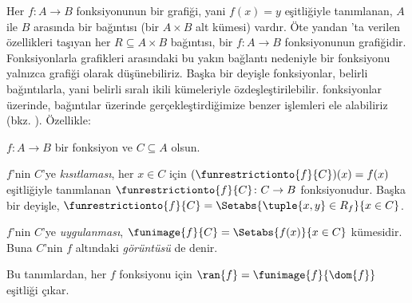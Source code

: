 \begin{explain}
Her $f\colon A \to B$ fonksiyonunun bir grafiği, yani $f(x)=y$ eşitliğiyle
tanımlanan, $A$ ile $B$ arasında bir bağıntısı (bir $A\times B$ alt kümesi)
vardır. Öte yandan
'ta verilen özellikleri taşıyan her
$R \subseteq A \times B$ bağıntısı, bir $f \colon A \to B$ fonksiyonunun
grafiğidir. Fonksiyonlarla grafikleri arasındaki bu yakın bağlantı nedeniyle
bir fonksiyonu yalnızca grafiği olarak düşünebiliriz. Başka bir deyişle
fonksiyonlar, belirli bağıntılarla, yani belirli sıralı ikili kümeleriyle
özdeşleştirilebilir.  fonksiyonlar
üzerinde, bağıntılar üzerinde gerçekleştirdiğimize benzer işlemleri ele
alabiliriz (bkz. ). Özellikle:
\end{explain}

\begin{defn}
$f \colon A \to B$ bir fonksiyon ve $C\subseteq A$ olsun.

$f$'nin $C$'ye \emph{kısıtlaması}, her $x \in C$ için
$(\funrestrictionto{f}{C})(x)=f(x)$ eşitliğiyle tanımlanan
$\funrestrictionto{f}{C}\colon C \to B$ fonksiyonudur. Başka bir deyişle,
$\funrestrictionto{f}{C} = \Setabs{\tuple{x, y} \in R_f}{x \in C}$.

$f$'nin $C$'ye \emph{uygulanması}, $\funimage{f}{C} =
\Setabs{f(x)}{x \in C}$ kümesidir. Buna $C$'nin $f$ altındaki
\emph{görüntüsü} de denir.
\end{defn}

\begin{explain}
Bu tanımlardan, her $f$ fonksiyonu için $\ran{f} =
\funimage{f}{\dom{f}}$ eşitliği çıkar.
\end{explain}

